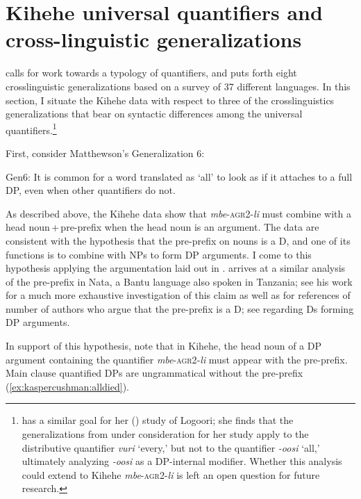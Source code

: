 \documentclass[output=paper,modfonts,nonflat]{langsci/langscibook}
\begin{document}
 

\section{Kihehe universal quantifiers and cross-linguistic generalizations}\label{sec:kaspercushman:5}  \label{ex:kaspercushman:type}
\citet{Matthewson2013} calls for work towards a typology of quantifiers, and puts forth eight crosslinguistic generalizations based on a survey of 37 different languages. In this section, I situate the Kihehe data with respect to three of the crosslinguistics generalizations that bear on syntactic differences among the universal quantifiers.\footnote{\citeauthor{Landman2016} has a similar goal for her (\citeyear{Landman2016}) study of Logoori; she finds that the generalizations from \cite{Matthewson2013} under consideration for her study apply to the distributive quantifier \textit{vuri} `every,' but not to the quantifier \textit{-oosi} `all,' ultimately analyzing \textit{-oosi} as a DP-internal modifier. Whether this analysis could extend to Kihehe \textit{mbe}-\textsc{agr2}-\textit{li} is left an open question for future research.}  



First, consider Matthewson's Generalization 6:

\begin{exe}
\ex Gen6: It is common for a word translated as `all' to look as if it attaches to a full DP, even when other quantifiers do not. \citep[35]{Matthewson2013}
\end{exe}

As described above, the Kihehe data show that \textit{mbe}-\textsc{agr2}-\textit{li} must combine with a head noun\,+\,pre-prefix when the head noun is an argument. The data are consistent with the hypothesis that the pre-prefix on nouns is a D, and one of its functions is to combine with NPs to form DP arguments. I come to this hypothesis applying the argumentation laid out in \cite{Matthewson2001}. \cite{gambarage16} arrives at a similar analysis of the pre-prefix in Nata, a Bantu language also spoken in Tanzania; see his work for a much more exhaustive investigation of this claim as well as for references of number of authors who argue that the pre-prefix is a D; see \cite{longobardi94} regarding Ds forming DP arguments.

In support of this hypothesis, note that in Kihehe, the head noun of a DP argument containing the quantifier \textit{mbe}-\textsc{agr2}-\textit{li} must appear with the pre-prefix. Main clause quantified DPs are ungrammatical without the pre-prefix (\ref{ex:kaspercushman:alldied}).
\end{document}
